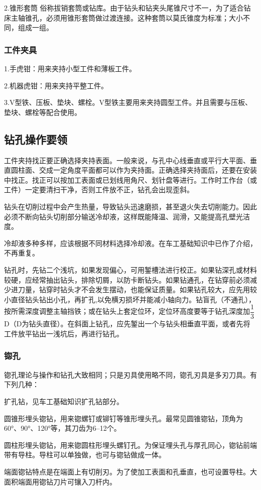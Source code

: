\documentclass{ctexbook}
\begin{document}
2.锥形套筒 俗称拔销套筒或钻库。由于钻头和钻夹头尾锥尺寸不一，为了适合钻床主轴锥孔，必须用锥形套筒做过渡连接。这种套筒以莫氏锥度为标准；大小不同，组成一组。
\subsubsection{工件夹具}
1.手虎钳：用来夹持小型工件和薄板工件。

2.机器虎钳：用来夹持平整工件。

3.V型铁、压板、垫块、螺栓。V型铁主要用来夹持圆型工件。并且需要与压板、垫块、螺栓等配合使用。
\subsection{钻孔操作要领}
工件夹持找正要正确选择夹持表面。一般来说，与孔中心线垂直或平行大平面、垂直圆柱面、交成一定角度平面都可以作为夹持面。正确选择夹持面后，还要在安装中找正。找正可以按加工表面或已划线用角尺、划针盘等进行。工作时工作台（或工件）一定要清扫干净，否则工件放不正，钻孔会出现歪斜。

钻头在切削过程中会产生热量，导致钻头迅速磨损，甚至退火失去切削能力。因此必须不断向钻头切削部分输送冷却液，这样既能降温、润滑，又能提高孔壁光洁度。

冷却液多种多样，应该根据不同材料选择冷却液。在车工基础知识中已作了介绍，不再重复。

钻孔时，先钻二个浅坑，如果发现偏心，可用錾槽法进行校正。如果钻深孔或材料较硬，应经常抽出钻头，排除切屑，以防卡断钻头。如果钻通孔，在钻穿前必须减少进刀量，钻穿时钻头才不会发生摆动，也能保证质量。如果钻孔较大，应先用较小直径钻头钻出小孔，再扩孔,以免横刃损坏并能减小轴向力。钻盲孔（不通孔），按所需深度调整主轴挡铁；或在钻头上套定位环，定位环高度要等于钻孔深度加$\dfrac{1}{3}$D（D为钻头直径）。在斜面上钻孔，应先錾出一个与钻头相垂直平面，或者先将工件放平钻出一浅坑后，再进行钻孔。
\subsubsection{锪孔}
锪孔理论与操作和钻孔大致相同；只是刃具使用略不同，锪孔刃具是多刃刀具。有下列几种：

扩孔钻，见车工基础知识扩孔钻部分。

圆锥形埋头锪钻，用来锪螺钉或铆钉等锥形埋头孔。最常见圆锥锪钻，顶角为60°、90°、120°等，其刀齿为6--12个。

圆柱形埋头锪钻，用来锪圆柱形埋头螺钉孔。为保证埋头孔与厚孔同心，锪钻前端带有导柱。导柱可以单独做，也可与锪钻做成一体。

端面锪钻特点是在端面上有切削刃。为了使加工表面和孔垂直，也可设置导柱。大面积端面用锪钻刀片可镶入刀杆内。
\end{document}
